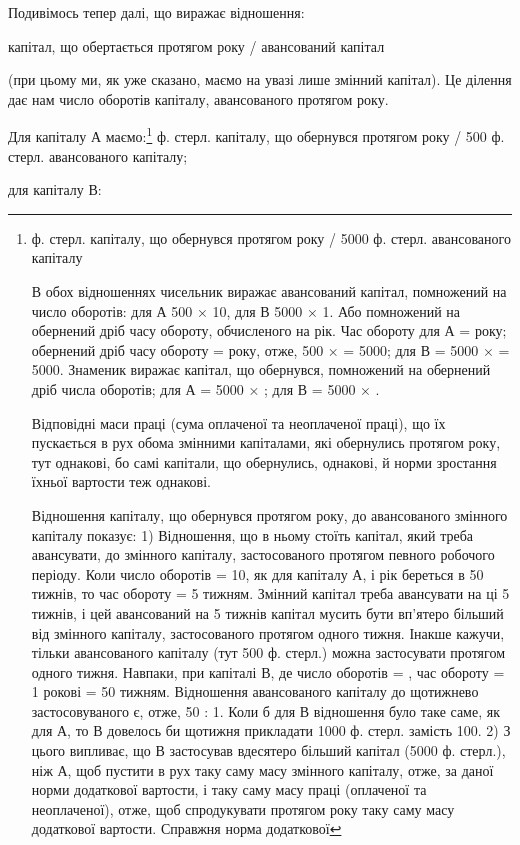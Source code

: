Подивімось тепер далі, що виражає відношення:

капітал, що обертається протягом року / авансований капітал

(при цьому ми, як уже сказано, маємо на увазі лише змінний капітал).
Це ділення дає нам число оборотів капіталу, авансованого протягом року.

Для капіталу А маємо:\footnote{
ф. стерл. капіталу, що обернувся протягом року / 5000 ф. стерл. авансованого капіталу

В обох відношеннях чисельник виражає авансований капітал, помножений
на число оборотів: для А 500 × 10, для В 5000 × 1. Або помножений
на обернений дріб часу обороту, обчисленого на рік. Час
обороту для А =  року; обернений дріб часу обороту =  року,
отже, 500 ×  = 5000; для В = 5000 ×  = 5000. Знаменик виражає
капітал, що обернувся, помножений на обернений дріб числа
оборотів; для А = 5000 × ; для В = 5000 × .

Відповідні маси праці (сума оплаченої та неоплаченої праці), що їх
пускається в рух обома змінними капіталами, які обернулись протягом
року, тут однакові, бо самі капітали, що обернулись, однакові, й норми
зростання їхньої вартости теж однакові.

Відношення капіталу, що обернувся протягом року, до авансованого
змінного капіталу показує: 1) Відношення, що в ньому стоїть капітал,
який треба авансувати, до змінного капіталу, застосованого протягом
певного робочого періоду. Коли число оборотів = 10, як для капіталу
А, і рік береться в 50 тижнів, то час обороту = 5 тижням. Змінний
капітал треба авансувати на ці 5 тижнів, і цей авансований на 5 тижнів
капітал мусить бути вп’ятеро більший від змінного капіталу, застосованого
протягом одного тижня. Інакше кажучи, тільки  авансованого
капіталу (тут 500 ф. стерл.) можна застосувати протягом одного тижня.
Навпаки, при капіталі В, де число оборотів = , час обороту = 1 рокові
= 50 тижням. Відношення авансованого капіталу до щотижнево застосовуваного
є, отже, 50 : 1. Коли б для В відношення було таке саме,
як для А, то В довелось би щотижня прикладати 1000 ф. стерл. замість
100. 2) З цього випливає, що В застосував вдесятеро більший
капітал (5000 ф. стерл.), ніж А, щоб пустити в рух таку саму масу змінного
капіталу, отже, за даної норми додаткової вартости, і таку саму
масу праці (оплаченої та неоплаченої), отже, щоб спродукувати протягом
року таку саму масу додаткової вартости. Справжня норма додаткової
} ф. стерл. капіталу, що обернувся протягом року / 500 ф. стерл. авансованого капіталу;

для капіталу В:
\parbreak{}  %
